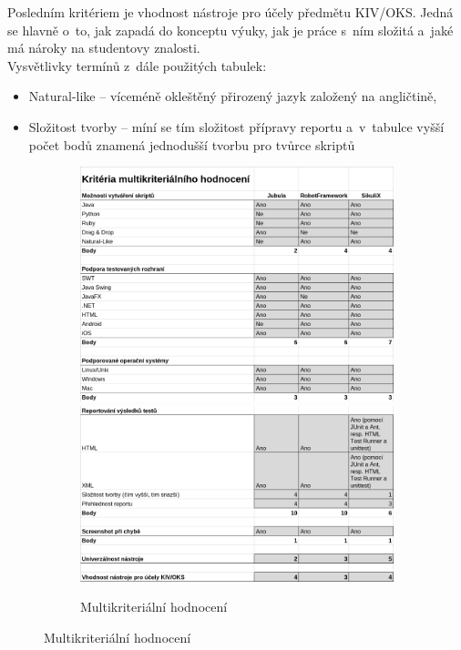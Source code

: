 Posledním kritériem je vhodnost nástroje pro účely předmětu KIV/OKS. Jedná se hlavně o~to, jak zapadá do konceptu výuky, jak je práce s~ním složitá a~jaké má nároky na studentovy znalosti.
\\[\topsep]Vysvětlivky termínů z~dále použitých tabulek:
\vspace{-\topsep}
\begin{itemize}
	\item Natural-like -- víceméně okleštěný přirozený jazyk založený na angličtině,
	\item Složitost tvorby -- míní se tím složitost přípravy reportu a~v~tabulce vyšší počet bodů znamená jednodušší tvorbu pro tvůrce skriptů
\end{itemize}
\begin{figure}[ht!]
	\begin{subfigure}{\textwidth}
		\centering
		\caption{Multikriteriální hodnocení}
		\label{MKHodn}
		\includegraphics[width=13.5cm]{img/Kriteria/Kriteria1.png}
		\includegraphics[width=13.5cm]{img/Kriteria/Kriteria2.png}
	\end{subfigure}
\end{figure}
